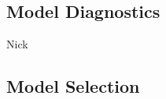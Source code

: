 \documentclass[table]{beamer}\usepackage[]{graphicx}\usepackage[]{color}
\begin{document}

\subsection{Model Diagnostics}

\begin{frame}{Nick}


\end{frame}


\subsection{Model Selection}
\end{document}

